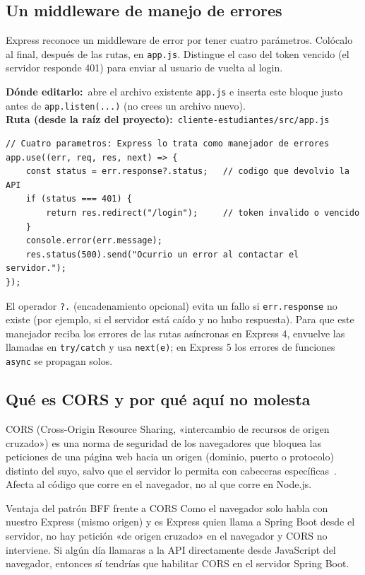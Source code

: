 \documentclass[11pt]{article}
\newcommand{\editaren}[2]{\begin{ubic}{\footnotesize\textbf{\color{ndverdeo}D\'onde editarlo:}~abre el archivo existente #1.\\[2pt]\textbf{\color{ndverdeo}Ruta (desde la ra\'iz del proyecto):}~\texttt{#2}}\end{ubic}\nobreak\vspace{3pt}}
\begin{document}
\subsection{Un middleware de manejo de errores}
Express reconoce un middleware de error por tener cuatro parámetros. Colócalo al final, después de las rutas, en \texttt{app.\allowbreak{}js}. Distingue el caso del token vencido (el servidor responde 401) para enviar al usuario de vuelta al login.

\editaren{\texttt{app.js} e inserta este bloque justo antes de \texttt{app.listen(...)} (no crees un archivo nuevo)}{cliente-estudiantes/src/app.js}
\begin{cajacodigo}
\begin{lstlisting}[style=js]
// Cuatro parametros: Express lo trata como manejador de errores
app.use((err, req, res, next) => {
	const status = err.response?.status;   // codigo que devolvio la API
	if (status === 401) {
		return res.redirect("/login");     // token invalido o vencido
	}
	console.error(err.message);
	res.status(500).send("Ocurrio un error al contactar el servidor.");
});
\end{lstlisting}
\end{cajacodigo}
\vspace{2pt}
El operador \texttt{?.} (encadenamiento opcional) evita un fallo si \texttt{err.\allowbreak{}response} no existe (por ejemplo, si el servidor está caído y no hubo respuesta). Para que este manejador reciba los errores de las rutas asíncronas en Express 4, envuelve las llamadas en \texttt{try/catch} y usa \texttt{next(e)}; en Express 5 los errores de funciones \texttt{async} se propagan solos.

\subsection{Qué es CORS y por qué aquí no molesta}
CORS (Cross-Origin Resource Sharing, «intercambio de recursos de origen cruzado») es una norma de seguridad de los navegadores que bloquea las peticiones de una página web hacia un origen (dominio, puerto o protocolo) distinto del suyo, salvo que el servidor lo permita con cabeceras específicas~\citep{whatwg2024fetch}. Afecta al código que corre en el navegador, no al que corre en Node.js.

\begin{cajatip}{Ventaja del patrón BFF frente a CORS}
Como el navegador solo habla con nuestro Express (mismo origen) y es Express quien llama a Spring Boot desde el servidor, no hay petición «de origen cruzado» en el navegador y CORS no interviene. Si algún día llamaras a la API directamente desde JavaScript del navegador, entonces sí tendrías que habilitar CORS en el servidor Spring Boot.\par
\end{cajatip}
\end{document}
